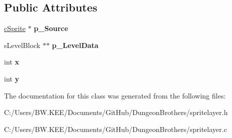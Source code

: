 \subsection*{Public Attributes}
\begin{DoxyCompactItemize}
\item 
\hypertarget{classc_sprite_layer_aa9ab70d8f1f530b29f3b810aeaa2130c}{\hyperlink{classc_sprite}{c\-Sprite} $\ast$ {\bfseries p\-\_\-\-Source}}\label{classc_sprite_layer_aa9ab70d8f1f530b29f3b810aeaa2130c}

\item 
\hypertarget{classc_sprite_layer_ad3349a975340a5b3bb820f08ab205aac}{s\-Level\-Block $\ast$$\ast$ {\bfseries p\-\_\-\-Level\-Data}}\label{classc_sprite_layer_ad3349a975340a5b3bb820f08ab205aac}

\item 
\hypertarget{classc_sprite_layer_a49266cf4ee91ab9da9a8d0b76b84227f}{int {\bfseries x}}\label{classc_sprite_layer_a49266cf4ee91ab9da9a8d0b76b84227f}

\item 
\hypertarget{classc_sprite_layer_a9a4e4406d781d9171ad914d9189e871c}{int {\bfseries y}}\label{classc_sprite_layer_a9a4e4406d781d9171ad914d9189e871c}

\end{DoxyCompactItemize}


The documentation for this class was generated from the following files\-:\begin{DoxyCompactItemize}
\item 
C\-:/\-Users/\-B\-W.\-K\-E\-E/\-Documents/\-Git\-Hub/\-Dungeon\-Brothers/spritelayer.\-h\item 
C\-:/\-Users/\-B\-W.\-K\-E\-E/\-Documents/\-Git\-Hub/\-Dungeon\-Brothers/spritelayer.\-c\end{DoxyCompactItemize}
